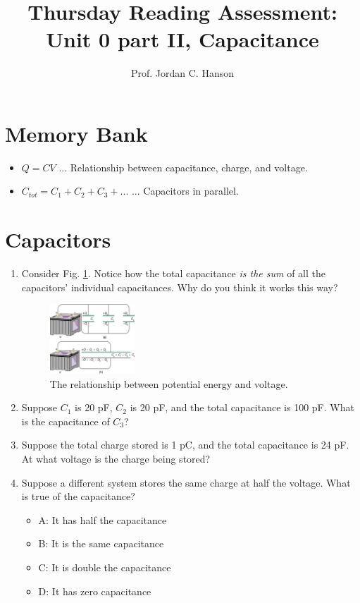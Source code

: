 \documentclass{article}
\begin{document}
\title{Thursday Reading Assessment: Unit 0 part II, Capacitance}
\author{Prof. Jordan C. Hanson}

\maketitle

\section{Memory Bank}

\begin{itemize}
\item $Q = CV$ ... Relationship between capacitance, charge, and voltage.
\item $C_{tot} = C_1 + C_2 + C_3 + ...$ ... Capacitors in parallel.
\end{itemize}

\section{Capacitors}

\begin{enumerate}
\item Consider Fig. \ref{fig:plates}.  Notice how the total capacitance \textit{is the sum} of all the capacitors' individual capacitances.  Why do you think it works this way? \\ \vspace{1.5cm}
\begin{figure}[ht]
\centering
\includegraphics[width=0.3\textwidth]{cap1.jpeg}
\caption{\label{fig:plates} The relationship between potential energy and voltage.}
\end{figure}
\item Suppose $C_1$ is 20 pF, $C_2$ is 20 pF, and the total capacitance is 100 pF.  What is the capacitance of $C_3$? \\ \vspace{1cm}
\item Suppose the total charge stored is 1 pC, and the total capacitance is 24 pF.  At what voltage is the charge being stored? \\ \vspace{1cm}
\item Suppose a different system stores the same charge at half the voltage.  What is true of the capacitance?
\begin{itemize}
\item A: It has half the capacitance
\item B: It is the same capacitance
\item C: It is double the capacitance
\item D: It has zero capacitance
\end{itemize}
\end{enumerate}
\end{document}
